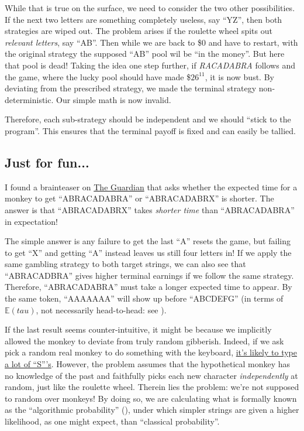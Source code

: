 \documentclass[11pt]{article}
\newcommand{\E}{\mathbb{E}}
\begin{document}
While that is true on the surface, we need to consider the two other possibilities. If the next two letters are something completely useless, say ``YZ'', then both strategies are wiped out. The problem arises if the roulette wheel spits out \emph{relevant letters}, say ``AB''. Then while we are back to \$0 and have to restart, with the original strategy the supposed ``AB'' pool wil be ``in the money''. But here that pool is dead! Taking the idea one step further, if \textit{RACADABRA} follows and the game, where the lucky pool should have made \$$26^{11}$, it is now bust. By deviating from the prescribed strategy, we made the terminal strategy non-deterministic. Our simple math is now invalid.

Therefore, each sub-strategy should be independent and we should ``stick to the program''. This ensures that the terminal payoff is fixed and can easily be tallied.

\subsection{Just for fun...}
I found a brainteaser on \href{https://www.theguardian.com/science/2023/mar/20/can-you-solve-it-the-infinite-monkey-theorem}{The Guardian} that asks whether the expected time for a monkey to get ``ABRACADABRA'' or ``ABRACADABRX'' is shorter. The answer is that ``ABRACADABRX'' takes \emph{shorter time} than ``ABRACADABRA'' in expectation! 

The simple answer is any failure to get the last ``A'' resets the game, but failing to get ``X'' and getting ``A'' instead leaves us still four letters in! If we apply the same gambling strategy to both target strings, we can also see that ``ABRACADBRA'' gives higher terminal earnings if we follow the same strategy. Therefore, ``ABRACADABRA'' must take a longer expected time to appear. By the same token, ``AAAAAAA'' will show up before ``ABCDEFG'' (in terms of $\E(tau)$, not necessarily head-to-head: see \cite{Li:1980}).

If the last result seems counter-intuitive, it might be because we implicitly allowed the monkey to deviate from truly random gibberish. Indeed, if we ask pick a random real monkey to do something with the keyboard, \href{https://www.bbc.co.uk/devon/news_features/2003/monkey_words.shtml}{it's likely to type a lot of ``S'''s}. However, the problem assumes that the hypothetical monkey has no knowledge of the past and faithfully picks each new character \emph{independently} at random, just like the roulette wheel. Therein lies the problem: we're not supposed to random over monkeys! By doing so, we are calculating what is formally known as the ``algorithmic probability'' (\cite{Hutter:2007}), under which simpler strings are given a higher likelihood, as one might expect, than ``classical probability''.
\end{document}
